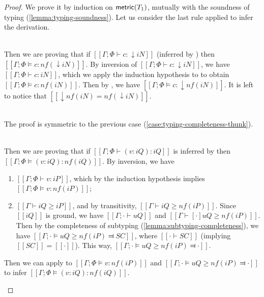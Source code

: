 \begin{proof}
    We prove it by induction on $\mathsf{metric}(T_1)$, mutually with 
    the soundness of typing (\cref{lemma:typing-soundness}).
    Let us consider the last rule applied to infer the derivation.
    \begin{caseof}

        \item {}\\
            \label{case:typing-completeness-thunk}
            Then we are proving that if 
            $[[Γ; Φ ⊢ {c} : ↓iN]]$ (inferred by )
            then $[[Γ; Φ ⊨ {c} : nf(↓iN)]]$.
            By inversion of $[[Γ; Φ ⊢ {c} : ↓iN]]$, we have
            $[[Γ; Φ ⊢ c : iN]]$, which we apply the induction hypothesis to
            to obtain $[[Γ; Φ ⊨ c : nf(iN)]]$.
            Then by , we have $[[Γ; Φ ⊨ {c} : ↓nf(iN)]]$.
            It is left to notice that $[[↓nf(iN) = nf(↓iN)]]$.

        \item {}\\
            The proof is symmetric to the previous case 
            (\cref{case:typing-completeness-thunk}).

        \item {}\\
            \label{case:typing-completeness-pannot}
            Then we are proving that if
            $[[Γ; Φ ⊢ (v : iQ) : iQ]]$ is inferred by 
            then $[[Γ; Φ ⊨ (v : iQ) : nf(iQ)]]$.
            By inversion, we have
            \begin{enumerate}
                \item $[[Γ; Φ ⊢ v : iP]]$, which
                    by the induction hypothesis implies $[[Γ; Φ ⊨ v : nf(iP)]]$;
                \item $[[Γ ⊢ iQ ≥ iP]]$, and by transitivity, $[[Γ ⊢ iQ ≥ nf(iP)]]$.
                    Since $[[iQ]]$ is ground, 
                    we have $[[Γ ; · ⊢ uQ]]$ and $[[Γ ⊢ [·]uQ ≥ nf(iP)]]$.
                    Then by the completeness of subtyping
                    (\cref{lemma:subtyping-completeness}), we have 
                    $[[Γ ; · ⊨ uQ ≥ nf(iP) ⫤ SC]]$, where $[[· ⊢ SC]]$ 
                    (implying $[[SC]] = [[·]]$).
                    This way, $[[Γ ; · ⊨ uQ ≥ nf(iP) ⫤ ·]]$.
            \end{enumerate}
            Then we can apply  to
            $[[Γ; Φ ⊨ v : nf(iP)]]$ and  $[[Γ ; · ⊨ uQ ≥ nf(iP) ⫤ ·]]$
            to infer $[[Γ; Φ ⊨ (v : iQ) : nf(iQ)]]$.


\end{caseof}
\end{proof}
